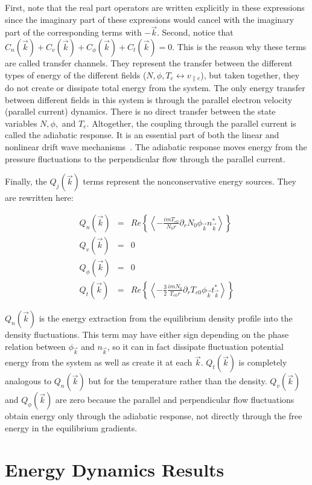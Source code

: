 \documentclass[showpacs,preprintnumbers,amsmath,amssymb,superscriptaddress,aip]{revtex4-1}
\def\beqar{\begin{eqnarray}}
\def\eeqar{\end{eqnarray}}
\def\para{\parallel}
\newcommand{\pdr}{\partial_r}
\begin{document}
First, note that the real part operators are written explicitly in these expressions since the imaginary part of these expressions would cancel with the imaginary part of the 
corresponding terms with $-\vec{k}$. Second, notice that $C_n(\vec{k}) + C_v(\vec{k}) + C_\phi(\vec{k}) + C_t(\vec{k}) = 0$.
This is the reason why these terms are called transfer channels. They represent the transfer
between the different types of energy of the different fields ($N,\phi,T_e \leftrightarrow v_{\para e}$), but taken together, they do not create or dissipate total
energy from the system. The only energy transfer between different fields in this system is through the parallel electron velocity (parallel current) dynamics. There is no direct transfer between
the state variables $N, \phi,$ and $T_e$.  Altogether, the coupling through the parallel current is called the
adiabatic response. It is an essential part of both the linear and nonlinear
drift wave mechanisms~\cite{scott2002,scott2005}. The adiabatic response moves energy from the pressure fluctuations to the perpendicular flow through the parallel current.

Finally, the $Q_j(\vec{k})$ terms represent the nonconservative energy sources. They are rewritten here:

\beqar
Q_n(\vec{k}) & = & Re \left\{ \left< -\frac{i m T_{e0}}{N_0 r} \pdr N_0 \phi_{\vec{k}} n_{\vec{k}}^*  \right> \right\}
\label{Qnk} \\
Q_v(\vec{k}) & = & 0
\label{Qvk} \\
Q_\phi(\vec{k}) & = & 0
\label{Qpk} \\
Q_t(\vec{k}) & = & Re \left\{ \left< -\frac{3}{2} \frac{i m N_0}{T_{e0} r} \pdr T_{e0} \phi_{\vec{k}} t_{\vec{k}}^*  \right> \right\}
\label{Qtk}
\eeqar

$Q_n(\vec{k})$ is the energy extraction from the equilibrium density profile into the density fluctuations. 
This term may have either sign depending on the phase relation between $\phi_{\vec{k}}$ and $n_{\vec{k}}$, 
so it can in fact dissipate fluctuation potential energy from the system as well as create it
at each $\vec{k}$. $Q_t(\vec{k})$ is completely analogous to $Q_n(\vec{k})$ but for the temperature rather than the density. 
$Q_v(\vec{k})$ and $Q_\phi(\vec{k})$ are zero because the parallel and perpendicular flow fluctuations obtain energy only through the adiabatic response, not directly through the free
energy in the equilibrium gradients.


\section{Energy Dynamics Results}
\label{dyn_results}
\end{document}
